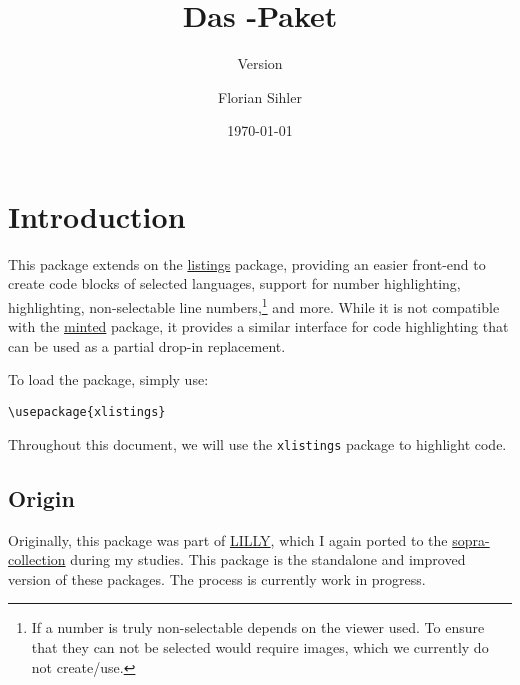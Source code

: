 \documentclass{scrartcl}
\title{Das \T{xlistings}-Paket}
\subtitle{Version \thexlstversion}
\date{\today}
\author{Florian Sihler}
\let\T\texttt
\begin{document}
    \maketitle
    
\section{Introduction}

This package extends on the \href{https://ctan.org/pkg/listings}{listings} package, providing an easier front-end to create code blocks of selected languages, support for number highlighting, highlighting, non-selectable line numbers,\footnote{If a number is truly non-selectable depends on the viewer used. To ensure that they can not be selected would require images, which we currently do not create/use.} and more.
While it is not compatible with the \href{https://ctan.org/pkg/minted}{minted} package, it provides a similar interface for code highlighting that can be used as a partial drop-in replacement.

To load the package, simply use:

\begin{verbatim}
\usepackage{xlistings}
\end{verbatim}

Throughout this document, we will use the \T{xlistings} package to highlight code.

\subsection{Origin}

Originally, this package was part of \href{https://github.com/EagleoutIce/LILLY}{\MakeUppercase{lilly}}, which I again ported to the \href{https://github.com/EagleoutIce/sopra-collection}{sopra-collection} during my studies. This package is the standalone and improved version of these packages. The process is currently work in progress.
\end{document}
